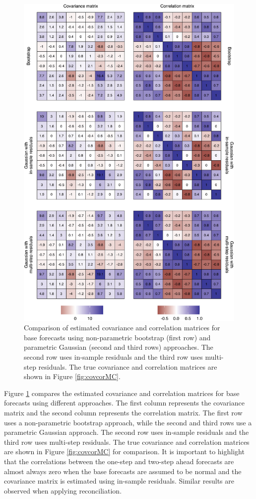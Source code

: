 \documentclass[a4paper,11pt]{article}
\theoremstyle{definition}
\begin{document}
\begin{figure}[p]
	\centering
	\includegraphics[width = 0.9\linewidth]{fig/simAR/base_cov.pdf}
	\caption{Comparison of estimated covariance and correlation matrices for base forecasts using non-parametric bootstrap (first row) and parametric Gaussian (second and third rows) approaches. The second row uses in-sample residuals and the third row uses multi-step residuals. The true covariance and correlation matrices are shown in Figure \ref{fig:covcorMC}.}
	\label{fig:ar2covcor}
	\end{figure}

Figure \ref{fig:ar2covcor} compares the estimated covariance and correlation matrices for base forecasts using different approaches. The first column represents the covariance matrix and the second column represents the correlation matrix. The first row uses a non-parametric bootstrap approach, while the second and third rows use a parametric Gaussian approach. The second row uses in-sample residuals and the third row uses multi-step residuals. The true covariance and correlation matrices are shown in Figure \ref{fig:covcorMC} for comparison. It is important to highlight that the correlations between the one-step and two-step ahead forecasts are almost always zero when the base forecasts are assumed to be normal and the covariance matrix is estimated using in-sample residuals. Similar results are observed when applying reconciliation.
\end{document}
